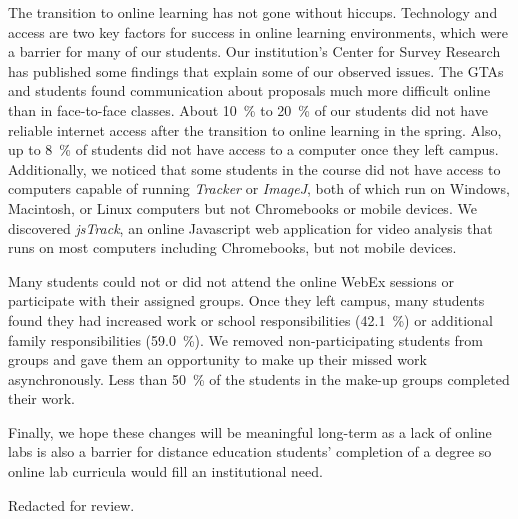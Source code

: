 \documentclass[aip, numerical, preprint]{revtex4-2}
\begin{document}
The transition to online learning has not gone without hiccups.  Technology and access are two
key factors for success in online learning environments, which were a barrier for many of our
students.  Our institution's Center for Survey Research has published some findings that
explain some of our observed issues.\citep{ECUcovidSurveyRedacted} The GTAs and students found
communication about proposals much more difficult online than in face-to-face classes.  About \SI{10}{\percent} to \SI{20}{\percent} of our students did not have reliable internet access after the transition to
online learning in the spring.\citep{ECUcovidSurveyRedacted} Also, up to \SI{8}{\percent} of students did not have
access to a computer once they left campus.\citep{ECUcovidSurveyRedacted} Additionally, we noticed that
some students in the course did not have access to computers capable of running \emph{Tracker}
or \emph{ImageJ}, both of which run on Windows, Macintosh, or Linux computers but not
Chromebooks or mobile devices. We discovered \emph{jsTrack}\citep{jstrack}, an online
Javascript web application for video analysis that runs on most computers including
Chromebooks, but not mobile devices.

Many students could not or did not attend the online WebEx sessions or participate with their
assigned groups.  Once they left campus, many students found they had increased work or school
responsibilities (\SI{42.1}{\percent}) or additional family responsibilities (\SI{59.0}{\percent}).\citep{ECUcovidSurveyRedacted}
We removed non-participating students from groups and gave them an opportunity to make up their
missed work asynchronously. Less than \SI{50}{\percent} of the students in the make-up groups
completed their work.

Finally, we hope these changes will be meaningful long-term as a lack of online labs is also a
barrier for distance education students' completion of a degree so online lab curricula would
fill an institutional need.


\begin{acknowledgments}
  Redacted for review.%
\end{acknowledgments}


\end{document}
